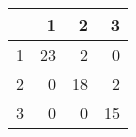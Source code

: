 \begin{tabular}{rrrr}
  \hline
 & 1 & 2 & 3 \\ 
  \hline
1 &  23 &   2 &   0 \\ 
  2 &   0 &  18 &   2 \\ 
  3 &   0 &   0 &  15 \\ 
   \hline
\end{tabular}
